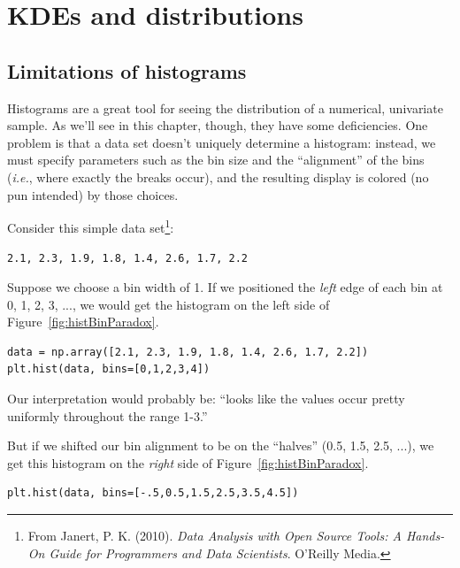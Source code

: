 
\chapter{KDEs and distributions}
\label{ch:KDEs}

\section{Limitations of histograms}

Histograms are a great tool for seeing the distribution of a numerical,
univariate sample. As we'll see in this chapter, though, they have some
deficiencies. One problem is that a data set doesn't uniquely determine a
histogram: instead, we must specify parameters such as the bin size and the
``alignment'' of the bins (\textit{i.e.}, where exactly the breaks occur), and
the resulting display is colored (no pun intended) by those choices.

Consider this simple data set\footnote{From Janert, P. K. (2010). \textit{Data
Analysis with Open Source Tools: A Hands-On Guide for Programmers and Data
Scientists}. O'Reilly Media.}:

\begin{center}
\texttt{2.1, 2.3, 1.9, 1.8, 1.4, 2.6, 1.7, 2.2}
\end{center}

Suppose we choose a bin width of 1. If we positioned the \textit{left} edge of
each bin at 0, 1, 2, 3, ..., we would get the histogram on the left side of
Figure~\ref{fig:histBinParadox}.

\begin{Verbatim}[fontsize=\footnotesize,samepage=true,frame=single,framesep=3mm]
data = np.array([2.1, 2.3, 1.9, 1.8, 1.4, 2.6, 1.7, 2.2])
plt.hist(data, bins=[0,1,2,3,4])
\end{Verbatim}

Our interpretation would probably be: ``looks like the values occur pretty
uniformly throughout the range 1-3.''

But if we shifted our bin alignment to be on the ``halves'' (0.5, 1.5, 2.5,
...), we get this histogram on the \textit{right} side of
Figure~\ref{fig:histBinParadox}.

\begin{Verbatim}[fontsize=\footnotesize,samepage=true,frame=single,framesep=3mm]
plt.hist(data, bins=[-.5,0.5,1.5,2.5,3.5,4.5])
\end{Verbatim}


